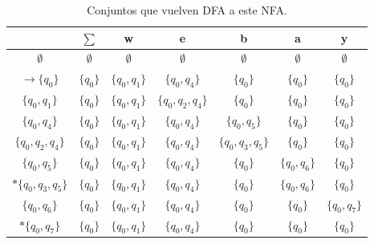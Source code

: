 \documentclass[12pt]{article}
\begin{document}
\begin{table}[H]
\centering
\begin{tabular}{|c|c|c|c|c|c|c|}
\hline 
\rule[-1ex]{0pt}{2.5ex}  & $\sum$ & w & e & b & a & y \\ 
\hline 
\rule[-1ex]{0pt}{2.5ex} $\emptyset$ & $\emptyset$ & $\emptyset$ & $\emptyset$ & $\emptyset$ & $\emptyset$ & $\emptyset$ \\ 
\hline 
\rule[-1ex]{0pt}{2.5ex} $\rightarrow\lbrace q_{0} \rbrace$ & $\lbrace q_{0} \rbrace$ & $\lbrace q_{0}, q_{1} \rbrace$ & $\lbrace q_{0}, q_{4} \rbrace$ & $\lbrace q_{0} \rbrace$ & $\lbrace q_{0} \rbrace$ & $\lbrace q_{0} \rbrace$ \\ 
\hline 
\rule[-1ex]{0pt}{2.5ex} $\lbrace q_{0}, q_{1} \rbrace$ & $\lbrace q_{0} \rbrace$ & $\lbrace q_{0}, q_{1} \rbrace$ & $\lbrace q_{0}, q_{2}, q_{4} \rbrace$ & $\lbrace q_{0} \rbrace$ & $\lbrace q_{0} \rbrace$ & $\lbrace q_{0} \rbrace$ \\ 
\hline 
\rule[-1ex]{0pt}{2.5ex} $\lbrace q_{0}, q_{4} \rbrace$ & $\lbrace q_{0} \rbrace$ & $\lbrace q_{0}, q_{1} \rbrace$ & $\lbrace q_{0}, q_{4} \rbrace$ & $\lbrace q_{0}, q_{5} \rbrace$ & $\lbrace q_{0} \rbrace$ & $\lbrace q_{0} \rbrace$ \\ 
\hline 
\rule[-1ex]{0pt}{2.5ex} $\lbrace q_{0}, q_{2}, q_{4} \rbrace$ & $\lbrace q_{0} \rbrace$ & $\lbrace q_{0}, q_{1} \rbrace$ & $\lbrace q_{0}, q_{4} \rbrace$ & $\lbrace q_{0}, q_{3}, q_{5} \rbrace$ & $\lbrace q_{0} \rbrace$ & $\lbrace q_{0} \rbrace$ \\ 
\hline 
\rule[-1ex]{0pt}{2.5ex} $\lbrace q_{0}, q_{5} \rbrace$ & $\lbrace q_{0} \rbrace$ & $\lbrace q_{0}, q_{1} \rbrace$ & $\lbrace q_{0}, q_{4} \rbrace$ & $\lbrace q_{0} \rbrace$ & $\lbrace q_{0}, q_{6} \rbrace$ & $\lbrace q_{0} \rbrace$ \\ 
\hline 
\rule[-1ex]{0pt}{2.5ex} $* \lbrace q_{0}, q_{3}, q_{5} \rbrace$ & $\lbrace q_{0} \rbrace$ & $\lbrace q_{0}, q_{1} \rbrace$ & $\lbrace q_{0}, q_{4} \rbrace$ & $\lbrace q_{0} \rbrace$ & $\lbrace q_{0}, q_{6} \rbrace$ & $\lbrace q_{0} \rbrace$ \\ 
\hline 
\rule[-1ex]{0pt}{2.5ex} $\lbrace q_{0}, q_{6} \rbrace$ & $\lbrace q_{0} \rbrace$ & $\lbrace q_{0}, q_{1} \rbrace$ & $\lbrace q_{0}, q_{4} \rbrace$ & $\lbrace q_{0} \rbrace$ & $\lbrace q_{0} \rbrace$ & $\lbrace q_{0}, q_{7} \rbrace$ \\ 
\hline 
\rule[-1ex]{0pt}{2.5ex} $* \lbrace q_{0}, q_{7} \rbrace$ & $\lbrace q_{0} \rbrace$ & $\lbrace q_{0}, q_{1} \rbrace$ & $\lbrace q_{0}, q_{4} \rbrace$ & $\lbrace q_{0} \rbrace$ & $\lbrace q_{0} \rbrace$ & $\lbrace q_{0} \rbrace$ \\ 
\hline 
\end{tabular} 
\caption{Conjuntos que vuelven DFA a este NFA.}
\label{tabla:conjuntos}
\end{table}
\end{document}
